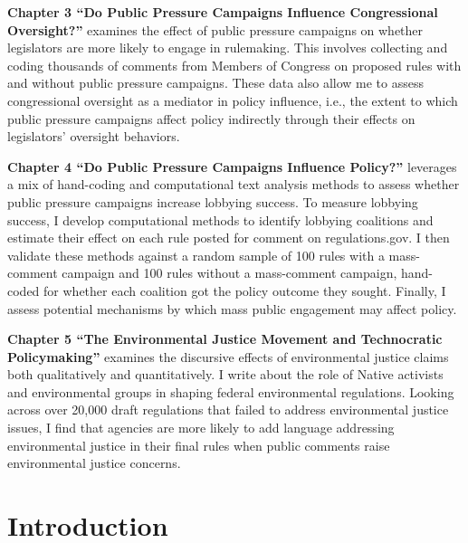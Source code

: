 \documentclass[
      12pt,
        ]{article}
\begin{document}
\textbf{Chapter 3 ``Do Public Pressure Campaigns Influence Congressional Oversight?''} examines the effect of public pressure campaigns on whether legislators are more likely to engage in rulemaking. This involves collecting and coding thousands of comments from Members of Congress on proposed rules with and without public pressure campaigns. These data also allow me to assess congressional oversight as a mediator in policy influence, i.e., the extent to which public pressure campaigns affect policy indirectly through their effects on legislators' oversight behaviors.

\textbf{Chapter 4 ``Do Public Pressure Campaigns Influence Policy?''} leverages a mix of hand-coding and computational text analysis methods to assess whether public pressure campaigns increase lobbying success. To measure lobbying success, I develop computational methods to identify lobbying coalitions and estimate their effect on each rule posted for comment on regulations.gov. I then validate these methods against a random sample of 100 rules with a mass-comment campaign and 100 rules without a mass-comment campaign, hand-coded for whether each coalition got the policy outcome they sought. Finally, I assess potential mechanisms by which mass public engagement may affect policy.

\textbf{Chapter 5 ``The Environmental Justice Movement and Technocratic Policymaking''} examines the discursive effects of environmental justice claims both qualitatively and quantitatively. I write about the role of Native activists and environmental groups in shaping federal environmental regulations. Looking across over 20,000 draft regulations that failed to address environmental justice issues, I find that agencies are more likely to add language addressing environmental justice in their final rules when public comments raise environmental justice concerns.

\newpage

\onehalfspacing

\setcounter{page}{1}

\hypertarget{introduction}{%
\section{Introduction}\label{introduction}}
\end{document}
